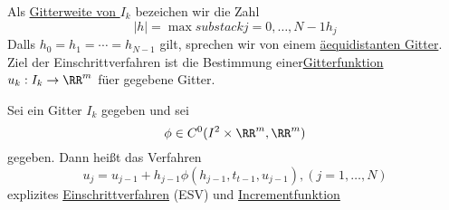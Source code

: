 Als \uline{Gitterweite von \( I_k  \)} bezeichen wir die Zahl \[ |h| =
  \max{substack j = 0,\dotsc,N-1}{h_j} \]
Dalls \( h_0 = h_1 = \cdots = h_{N-1} \) gilt, sprechen wir von einem
\uline{\"aequidistanten Gitter}. \\
Ziel der Einschrittverfahren ist die Bestimmung einer\uline{Gitterfunktion}
$u_k:I_k\rightarrow\RR^m$ f\"uer gegebene Gitter.

\begin{Def}
  Sei ein Gitter $I_k$ gegeben und sei \[
    \phi \in C^0(I^2\times \RR^m,\RR^m) \]
  gegeben. Dann hei\ss t das Verfahren \[
    u_j = u_{j-1} + h_{j-1} \phi (h_{j-1},t_{t-1},u_{j-1}), (j = 1,\dotsc,N) \]
    explizites \uline{Einschrittverfahren} (ESV) und \phi
    \uline{Incrementfunktion}
\end{Def}

